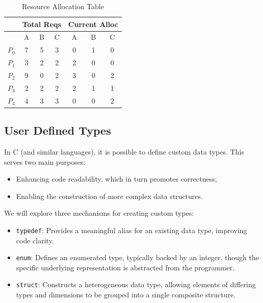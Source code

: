 \documentclass[a4paper, 10pt]{article}
\begin{document}
\begin{table}[h!]
    \centering
    \begin{tabular}{c|ccc|ccc}
        \hline
        \multicolumn{1}{c}{} & \multicolumn{3}{c|}{\textbf{Total Reqs}} & \multicolumn{3}{c}{\textbf{Current Alloc}}                 \\
        \hline
                             & A                                        & B                                          & C & A & B & C \\
        \hline
        $P_0$                & 7                                        & 5                                          & 3 & 0 & 1 & 0 \\
        $P_1$                & 3                                        & 2                                          & 2 & 2 & 0 & 0 \\
        $P_2$                & 9                                        & 0                                          & 2 & 3 & 0 & 2 \\
        $P_3$                & 2                                        & 2                                          & 2 & 2 & 1 & 1 \\
        $P_4$                & 4                                        & 3                                          & 3 & 0 & 0 & 2 \\
        \hline
    \end{tabular}
    \caption{Resource Allocation Table}
    \label{tab:resource_allocation}
\end{table}
\subsection{User Defined Types}
In C (and similar languages), it is possible to define custom data types. This serves two main purposes:
\begin{itemize}
    \item Enhancing code readability, which in turn promotes correctness;
    \item Enabling the construction of more complex data structures.
\end{itemize}
We will explore three mechanisms for creating custom types:
\begin{itemize}
    \item \texttt{typedef}: Provides a meaningful alias for an existing data type, improving code clarity.
    \item \texttt{enum}: Defines an enumerated type, typically backed by an integer, though the specific underlying representation is abstracted from the programmer.
    \item \texttt{struct}: Constructs a heterogeneous data type, allowing elements of differing types and dimensions to be grouped into a single composite structure.
\end{itemize}
\end{document}
